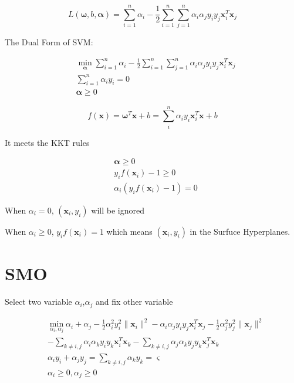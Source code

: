\documentclass[a4paper,12pt]{article}
\begin{document}
        \begin{equation}
            L(\bm{\omega},b,\bm{\alpha})=\sum_{i=1}^n\alpha_i-\frac{1}{2}\sum_{i=1}^n\sum_{j=1}^n\alpha_i\alpha_jy_iy_j\bm{x}_i^T\bm{x}_j
        \end{equation}

        The Dual Form of SVM:

        \begin{equation}
            \begin{split}
                & \min_{\bm{\alpha}} \sum_{i=1}^n\alpha_i-\frac{1}{2}\sum_{i=1}^n\sum_{j=1}^n\alpha_i\alpha_jy_iy_j\bm{x}_i^T\bm{x}_j\\
                & \sum_{i=1}^n\alpha_iy_i=0\\
                & \bm{\alpha}\geq 0
            \end{split}
        \end{equation}

        \begin{equation}
            f(\bm{x})=\bm{\omega}^T\bm{x}+b=\sum_{i}^n\alpha_iy_i\bm{x}_i^T\bm{x}+b
        \end{equation}

        It meets the KKT rules

        \begin{equation}
            \begin{split}
                & \bm{\alpha}\geq 0\\
                & y_if(\bm{x}_i)-1 \geq 0\\
                & \alpha_i(y_if(\bm{x}_i)-1)=0
            \end{split}
        \end{equation}

        When $\alpha_i=0$, $(\bm{x}_i,y_i)$ will be ignored

        When $\alpha_i\ge 0$, $y_if(\bm{x}_i)=1$ which means $(\bm{x}_i,y_i)$ in the Surfuce Hyperplanes.

    \section{SMO}

        Select two variable $\alpha_i$,$\alpha_j$ and fix other variable

        \begin{equation}
            \begin{split}
                & \min_{\alpha_i,\alpha_j} \alpha_i+\alpha_j-\frac{1}{2}\alpha_i^2y_i^2\|\bm{x}_i\|^2-\alpha_i\alpha_jy_iy_j\bm{x}_i^T\bm{x}_j-\frac{1}{2}\alpha_j^2y_j^2\|\bm{x}_j\|^2\\
                & -\sum_{k\neq i,j}\alpha_i\alpha_ky_iy_k\bm{x}_i^T\bm{x}_k-\sum_{k\neq i,j}\alpha_j\alpha_ky_jy_k\bm{x}_j^T\bm{x}_k\\
                & \alpha_iy_i+\alpha_jy_j=\sum_{k\neq i,j}\alpha_ky_k=\varsigma\\
                & \alpha_i \geq 0,\alpha_j \geq 0
            \end{split}
        \end{equation}
\end{document}
